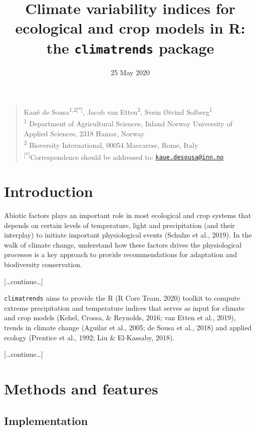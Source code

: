 \documentclass[
]{article}
\title{Climate variability indices for ecological and crop models in R:
the \texttt{climatrends} package}
\author{}
\date{\vspace{-2.5em}25 May 2020}
\begin{document}
\maketitle

\begin{quote}
Kauê de Sousa\textsuperscript{1,2{[}*{]}}, Jacob van
Etten\textsuperscript{2}, Svein Øivind Solberg\textsuperscript{1}\\
\textsuperscript{1} Department of Agricultural Sciences, Inland Norway
University of Applied Sciences, 2318 Hamar, Norway\\
\textsuperscript{2} Bioversity International, 00054 Maccarese, Rome,
Italy\\
\textsuperscript{{[}*{]}}Correspondence should be addressed to:
\href{mailto:kaue.desousa@inn.no}{\nolinkurl{kaue.desousa@inn.no}}
\end{quote}

\hfill\break

\hypertarget{introduction}{%
\section{Introduction}\label{introduction}}

Abiotic factors plays an important role in most ecological and crop
systems that depends on certain levels of temperature, light and
precipitation (and their interplay) to initiate important physiological
events (Schulze et al., 2019). In the walk of climate change, understand
how these factors drives the physiological processes is a key approach
to provide recommendations for adaptation and biodiversity conservation.

{[}\ldots continue\ldots{]}

\texttt{climatrends} aims to provide the R (R Core Team, 2020) toolkit
to compute extreme precipitation and temperature indices that serves as
input for climate and crop models (Kehel, Crossa, \& Reynolds, 2016; van
Etten et al., 2019), trends in climate change (Aguilar et al., 2005; de
Sousa et al., 2018) and applied ecology (Prentice et al., 1992; Liu \&
El-Kassaby, 2018).

{[}\ldots continue\ldots{]}

\hypertarget{methods-and-features}{%
\section{Methods and features}\label{methods-and-features}}

\hypertarget{implementation}{%
\subsection{Implementation}\label{implementation}}
\end{document}
